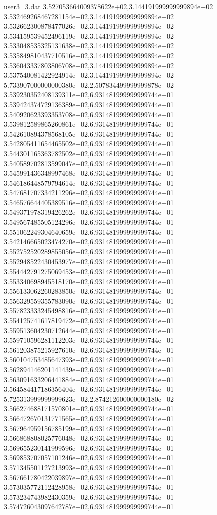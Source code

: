 \begin{filecontents}{user3_3.dat}
3.527053664009378622e+02,3.144191999999999894e+02
3.532469268467281154e+02,3.144191999999999894e+02
3.532662300878477026e+02,3.144191999999999894e+02
3.534159539452496119e+02,3.144191999999999894e+02
3.533048535325131638e+02,3.144191999999999894e+02
3.535849810437710516e+02,3.144191999999999894e+02
3.536043337803806708e+02,3.144191999999999894e+02
3.537540081422924914e+02,3.144191999999999894e+02
5.733907000000000380e+02,2.507834499999999878e+02
3.539230352408139311e+02,6.931481999999999744e+01
3.539424374729136389e+02,6.931481999999999744e+01
3.540920623393353708e+02,6.931481999999999744e+01
3.539812589865260861e+02,6.931481999999999744e+01
3.542610894378568105e+02,6.931481999999999744e+01
3.542805411654465502e+02,6.931481999999999744e+01
3.544301165363782502e+02,6.931481999999999744e+01
3.540589702813599047e+02,6.931481999999999744e+01
3.545991436348997468e+02,6.931481999999999744e+01
3.546186448579794614e+02,6.931481999999999744e+01
3.547681707334211296e+02,6.931481999999999744e+01
3.546576644405389516e+02,6.931481999999999744e+01
3.549371978319426262e+02,6.931481999999999744e+01
3.549567485505124296e+02,6.931481999999999744e+01
3.551062249304640659e+02,6.931481999999999744e+01
3.542146665023474270e+02,6.931481999999999744e+01
3.552752520289855056e+02,6.931481999999999744e+01
3.552948522430453977e+02,6.931481999999999744e+01
3.554442791275069453e+02,6.931481999999999744e+01
3.553340698945518170e+02,6.931481999999999744e+01
3.556133062260283850e+02,6.931481999999999744e+01
3.556329559355783090e+02,6.931481999999999744e+01
3.557823333245498816e+02,6.931481999999999744e+01
3.554125741617819472e+02,6.931481999999999744e+01
3.559513604230712644e+02,6.931481999999999744e+01
3.559710596281112203e+02,6.931481999999999744e+01
3.561203875215927610e+02,6.931481999999999744e+01
3.560104753485647393e+02,6.931481999999999744e+01
3.562894146201141439e+02,6.931481999999999744e+01
3.563091633206441884e+02,6.931481999999999744e+01
3.564584417186356404e+02,6.931481999999999744e+01
5.725313999999999623e+02,2.874212600000000180e+02
3.566274688171570801e+02,6.931481999999999744e+01
3.566472670131771565e+02,6.931481999999999744e+01
3.567964959156785199e+02,6.931481999999999744e+01
3.566868808025776048e+02,6.931481999999999744e+01
3.569655230141999596e+02,6.931481999999999744e+01
3.569853707057101246e+02,6.931481999999999744e+01
3.571345501127213993e+02,6.931481999999999744e+01
3.567661780422039897e+02,6.931481999999999744e+01
3.573035772112428958e+02,6.931481999999999744e+01
3.573234743982430359e+02,6.931481999999999744e+01
3.574726043097642787e+02,6.931481999999999744e+01

\end{filecontents}
